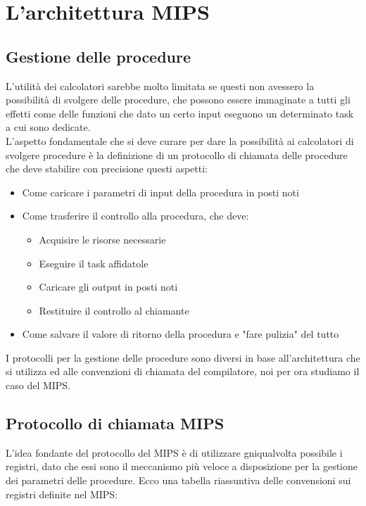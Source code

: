 \documentclass[class=book, crop=false]{standalone}
\begin{document}
\chapter{L'architettura MIPS}
\section{Gestione delle procedure}
L'utilità dei calcolatori sarebbe molto limitata se questi non avessero la possibilità di svolgere delle procedure, che possono essere immaginate a tutti gli effetti come delle funzioni che dato un certo input eseguono un determinato task a cui sono dedicate.\\
L'aspetto fondamentale che si deve curare per dare la possibilità ai calcolatori di svolgere procedure è la definizione di un protocollo di chiamata delle procedure che deve stabilire con precisione questi aspetti:
\begin{itemize}[noitemsep]
	\item Come caricare i parametri di input della procedura in posti noti
	\item Come trasferire il controllo alla procedura, che deve:
		\begin{itemize}[nolistsep, noitemsep]
			\item Acquisire le risorse necessarie
			\item Eseguire il task affidatole
			\item Caricare gli output in posti noti
			\item Restituire il controllo al chiamante
		\end{itemize}
	\item Come salvare il valore di ritorno della procedura e "fare pulizia" del tutto
\end{itemize}
I protocolli per la gestione delle procedure sono diversi in base all'architettura che si utilizza ed alle convenzioni di chiamata del compilatore, noi per ora studiamo il caso del MIPS.

\section{Protocollo di chiamata MIPS}
L'idea fondante del protocollo del MIPS è di utilizzare gniqualvolta possibile i registri, dato che essi sono il meccanismo più veloce a disposizione per la gestione dei parametri delle procedure. Ecco una tabella riassuntiva delle convensioni sui registri definite nel MIPS:
\end{document}
